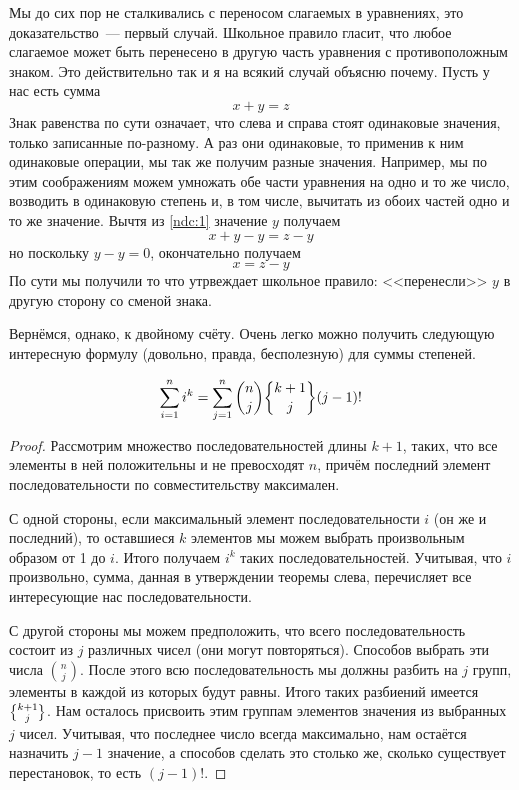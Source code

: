 Мы до сих пор не сталкивались с переносом слагаемых в уравнениях, это доказательство~--- первый случай. Школьное правило гласит, что любое слагаемое может быть перенесено в другую часть уравнения с противоположным знаком. Это действительно так и я на всякий случай объясню почему. Пусть у нас есть сумма
\begin{equation}\label{ndc:1}
x+y = z
\end{equation}
Знак равенства по сути означает, что слева и справа стоят одинаковые значения, только записанные по-разному. А раз они одинаковые, то применив к ним одинаковые операции, мы так же получим разные значения. Например, мы по этим соображениям можем умножать обе части уравнения на одно и то же число, возводить в одинаковую степень и, в том числе, вычитать из обоих частей одно и то же значение. Вычтя из \eqref{ndc:1} значение $y$ получаем
$$x + y - y = z - y$$
но поскольку $y-y=0$, окончательно получаем
$$x = z - y$$
По сути мы получили то что утрвеждает школьное правило: <<перенесли>> $y$ в другую сторону со сменой знака.

Вернёмся, однако, к двойному счёту. Очень легко можно получить следующую интересную формулу (довольно, правда, бесполезную) для суммы степеней.

\begin{thm}
$$\sum_{i=1}^n i^k = \sum_{j=1}^n {n \choose j}\sstirling{k+1}{j}(j-1)!$$
\end{thm}
\begin{proof}
Рассмотрим множество последовательностей длины $k+1$, таких, что все элементы в ней положительны и не превосходят $n$, причём последний элемент последовательности по совместительству максимален.

С одной стороны, если максимальный элемент последовательности $i$ (он же и последний), то оставшиеся $k$ элементов мы можем выбрать произвольным образом от 1 до $i$. Итого получаем $i^k$ таких последовательностей. Учитывая, что $i$ произвольно, сумма, данная в утверждении теоремы слева, перечисляет все интересующие нас последовательности.

С другой стороны мы можем предположить, что всего последовательность состоит из $j$ различных чисел (они могут повторяться). Способов выбрать эти числа $n\choose j$. После этого всю последовательность мы должны разбить на $j$ групп, элементы в каждой из которых будут равны. Итого таких разбиений имеется $\sstirling{k+1}{j}$. Нам осталось присвоить этим группам элементов значения из выбранных $j$ чисел. Учитывая, что последнее число всегда максимально, нам остаётся назначить $j-1$ значение, а способов сделать это столько же, сколько существует перестановок, то есть $(j-1)!$.
\end{proof}

